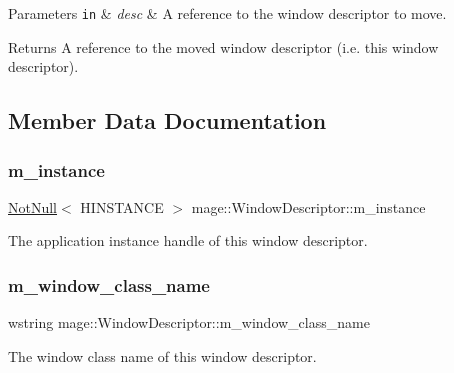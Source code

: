 \begin{DoxyParams}[1]{Parameters}
\mbox{\tt in}  & {\em desc} & A reference to the window descriptor to move. \\
\hline
\end{DoxyParams}
\begin{DoxyReturn}{Returns}
A reference to the moved window descriptor (i.\+e. this window descriptor). 
\end{DoxyReturn}


\subsection{Member Data Documentation}
\mbox{\label{classmage_1_1_window_descriptor_afa7ab62493d51db5d1ab6a4167f2da4a}} 
\subsubsection{\texorpdfstring{m\+\_\+instance}{m\_instance}}
{\footnotesize\ttfamily \mbox{\hyperlink{namespacemage_a8769f9d670d6b585ea306cb1062af94b}{Not\+Null}}$<$ H\+I\+N\+S\+T\+A\+N\+CE $>$ mage\+::\+Window\+Descriptor\+::m\+\_\+instance\hspace{0.3cm}{\ttfamily [private]}}

The application instance handle of this window descriptor. \mbox{\label{classmage_1_1_window_descriptor_abd3379a435cfea7aae78f4989635bfb5}} 
\subsubsection{\texorpdfstring{m\+\_\+window\+\_\+class\+\_\+name}{m\_window\_class\_name}}
{\footnotesize\ttfamily wstring mage\+::\+Window\+Descriptor\+::m\+\_\+window\+\_\+class\+\_\+name\hspace{0.3cm}{\ttfamily [private]}}

The window class name of this window descriptor. 
